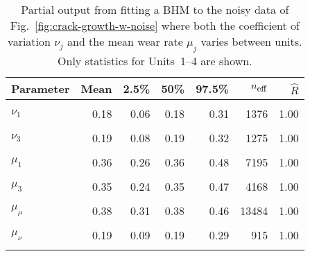 \begin{table}
\centering
\caption{\label{tab:pp_both}Partial output from fitting a BHM to the noisy data of Fig.~\ref{fig:crack-growth-w-noise} where both the coefficient of variation $\nu_j$ and the mean wear rate $\mu_j$ varies between units. Only statistics for Units~1--4 are shown.}
\centering
\begin{tabular}[t]{lrrrrrr}
\toprule
Parameter & Mean & 2.5\% & 50\% & 97.5\% & $n_{\small{\mbox{eff}}}$ & $\hat{R}$\\
\midrule
\cellcolor{gray!10}{$\sigma$} & \cellcolor{gray!10}{0.03} & \cellcolor{gray!10}{0.02} & \cellcolor{gray!10}{0.03} & \cellcolor{gray!10}{0.04} & \cellcolor{gray!10}{2700} & \cellcolor{gray!10}{1.00}\\
$\nu_1$ & 0.18 & 0.06 & 0.18 & 0.31 & 1376 & 1.00\\
\cellcolor{gray!10}{$\nu_2$} & \cellcolor{gray!10}{0.19} & \cellcolor{gray!10}{0.08} & \cellcolor{gray!10}{0.19} & \cellcolor{gray!10}{0.32} & \cellcolor{gray!10}{1358} & \cellcolor{gray!10}{1.00}\\
$\nu_3$ & 0.19 & 0.08 & 0.19 & 0.32 & 1275 & 1.00\\
\cellcolor{gray!10}{$\nu_4$} & \cellcolor{gray!10}{0.19} & \cellcolor{gray!10}{0.07} & \cellcolor{gray!10}{0.19} & \cellcolor{gray!10}{0.33} & \cellcolor{gray!10}{1254} & \cellcolor{gray!10}{1.00}\\
\addlinespace
$\mu_1$ & 0.36 & 0.26 & 0.36 & 0.48 & 7195 & 1.00\\
\cellcolor{gray!10}{$\mu_2$} & \cellcolor{gray!10}{0.42} & \cellcolor{gray!10}{0.32} & \cellcolor{gray!10}{0.42} & \cellcolor{gray!10}{0.56} & \cellcolor{gray!10}{4363} & \cellcolor{gray!10}{1.00}\\
$\mu_3$ & 0.35 & 0.24 & 0.35 & 0.47 & 4168 & 1.00\\
\cellcolor{gray!10}{$\mu_4$} & \cellcolor{gray!10}{0.34} & \cellcolor{gray!10}{0.23} & \cellcolor{gray!10}{0.34} & \cellcolor{gray!10}{0.46} & \cellcolor{gray!10}{3206} & \cellcolor{gray!10}{1.00}\\
$\mu_\mu$ & 0.38 & 0.31 & 0.38 & 0.46 & 13484 & 1.00\\
\addlinespace
\cellcolor{gray!10}{$\sigma_\mu$} & \cellcolor{gray!10}{0.07} & \cellcolor{gray!10}{0.01} & \cellcolor{gray!10}{0.07} & \cellcolor{gray!10}{0.17} & \cellcolor{gray!10}{1468} & \cellcolor{gray!10}{1.01}\\
$\mu_\nu$ & 0.19 & 0.09 & 0.19 & 0.29 & 915 & 1.00\\
\cellcolor{gray!10}{$\sigma_\nu$} & \cellcolor{gray!10}{0.04} & \cellcolor{gray!10}{0.00} & \cellcolor{gray!10}{0.03} & \cellcolor{gray!10}{0.11} & \cellcolor{gray!10}{1102} & \cellcolor{gray!10}{1.01}\\
\bottomrule
\end{tabular}
\end{table}

